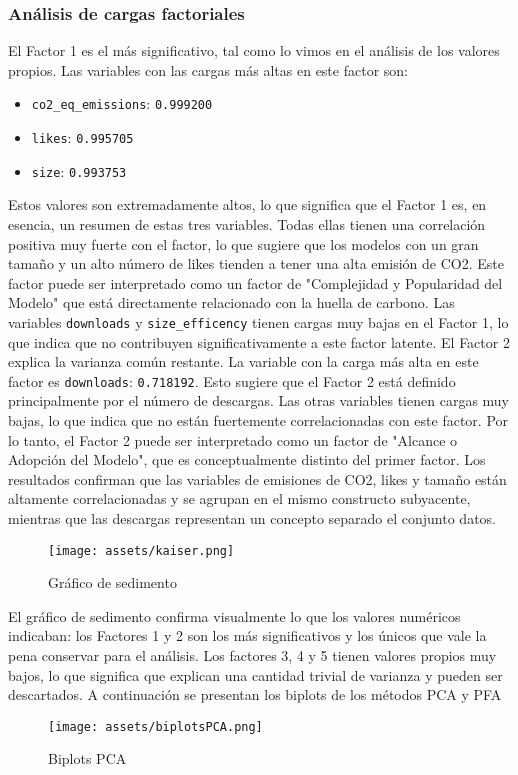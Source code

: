 \documentclass[journal]{IEEEtran}
\begin{document}
	\subsubsection{Análisis de cargas factoriales}
	El Factor 1 es el más significativo, tal como lo vimos en el análisis de los valores propios. Las variables con las cargas más altas en este factor son:
	\begin{itemize}
		\item \texttt{co2\_eq\_emissions}: \texttt{0.999200}
		\item \texttt{likes}: \texttt{0.995705}
		\item \texttt{size}: \texttt{0.993753}
	\end{itemize}
	Estos valores son extremadamente altos, lo que significa que el Factor 1 es, en esencia, un resumen de estas tres variables. Todas ellas tienen una correlación positiva muy fuerte con el factor, lo que sugiere que los modelos con un gran tamaño y un alto número de likes tienden a tener una alta emisión de CO2. Este factor puede ser interpretado como un factor de "Complejidad y Popularidad del Modelo" que está directamente relacionado con la huella de carbono.
	Las variables \texttt{downloads} y \texttt{size\_efficency} tienen cargas muy bajas en el Factor 1, lo que indica que no contribuyen significativamente a este factor latente.
	El Factor 2 explica la varianza común restante. La variable con la carga más alta en este factor es \texttt{downloads}: \texttt{0.718192}. Esto sugiere que el Factor 2 está definido principalmente por el número de descargas. Las otras variables tienen cargas muy bajas, lo que indica que no están fuertemente correlacionadas con este factor. Por lo tanto, el Factor 2 puede ser interpretado como un factor de "Alcance o Adopción del Modelo", que es conceptualmente distinto del primer factor.
	Los resultados confirman que las variables de emisiones de CO2, likes y tamaño están altamente correlacionadas y se agrupan en el mismo constructo subyacente, mientras que las descargas representan un concepto separado el conjunto datos.
	\begin{figure}[H]
		\centering
		\texttt{[image: assets/kaiser.png]}
		\caption{Gráfico de sedimento}
		\label{fig:pca_scatter}
	\end{figure}
	El gráfico de sedimento confirma visualmente lo que los valores numéricos indicaban: los Factores 1 y 2 son los más significativos y los únicos que vale la pena conservar para el análisis. Los factores 3, 4 y 5 tienen valores propios muy bajos, lo que significa que explican una cantidad trivial de varianza y pueden ser descartados.
	A continuación se presentan los biplots de los métodos PCA y PFA
	\begin{figure}[H]
		\centering
		\texttt{[image: assets/biplotsPCA.png]}
		\caption{Biplots PCA}
		\label{fig:pca_scatter}
	\end{figure}
\end{document}
